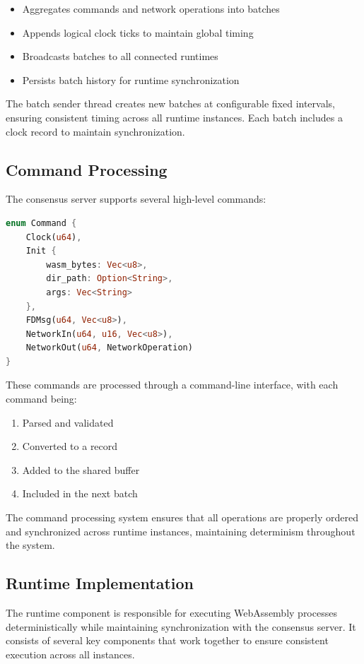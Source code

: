 \documentclass[10pt, 
]{IEEEtran}
\begin{document}
\begin{itemize}
    \item Aggregates commands and network operations into batches
    \item Appends logical clock ticks to maintain global timing
    \item Broadcasts batches to all connected runtimes
    \item Persists batch history for runtime synchronization
\end{itemize}

The batch sender thread creates new batches at configurable fixed intervals, ensuring consistent timing across all runtime instances. Each batch includes a clock record to maintain synchronization.

\subsection{Command Processing}

The consensus server supports several high-level commands:

\begin{lstlisting}[language=Rust]
enum Command {
    Clock(u64),
    Init { 
        wasm_bytes: Vec<u8>, 
        dir_path: Option<String>, 
        args: Vec<String> 
    },
    FDMsg(u64, Vec<u8>),
    NetworkIn(u64, u16, Vec<u8>),
    NetworkOut(u64, NetworkOperation)
}
\end{lstlisting}

These commands are processed through a command-line interface, with each command being:
\begin{enumerate}
    \item Parsed and validated
    \item Converted to a record
    \item Added to the shared buffer
    \item Included in the next batch
\end{enumerate}

The command processing system ensures that all operations are properly ordered and synchronized across runtime instances, maintaining determinism throughout the system.

\subsection{Runtime Implementation}

The runtime component is responsible for executing WebAssembly processes deterministically while maintaining synchronization with the consensus server. It consists of several key components that work together to ensure consistent execution across all instances.
\end{document}
